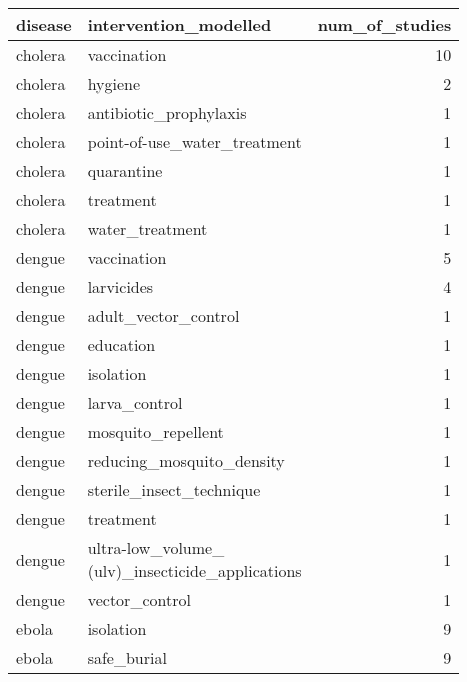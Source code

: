 \documentclass[
]{article}
\begin{document}
\begin{longtable}{llr}
\toprule
disease & intervention\_modelled & num\_of\_studies\\
\midrule
\endhead
cholera & vaccination & 10\\

cholera & hygiene & 2\\

cholera & antibiotic\_prophylaxis & 1\\

cholera & point-of-use\_water\_treatment & 1\\
 
cholera & quarantine & 1\\
 
cholera & treatment & 1\\
 
cholera & water\_treatment & 1\\
 
dengue & vaccination & 5\\
 
dengue & larvicides & 4\\
 
dengue & adult\_vector\_control & 1\\
 
dengue & education & 1\\
 
dengue & isolation & 1\\
 
dengue & larva\_control & 1\\
 
dengue & mosquito\_repellent & 1\\
 
dengue & reducing\_mosquito\_density & 1\\
 
dengue & sterile\_insect\_technique & 1\\
 
dengue & treatment & 1\\
 
dengue & 
\makecell[l]{
	ultra-low\_volume\_\\
	(ulv)\_insecticide\_applications
	} & 1\\
 
dengue & vector\_control & 1\\
 
ebola & isolation & 9\\
 
ebola & safe\_burial & 9\\
 

\end{longtable}
\end{document}

